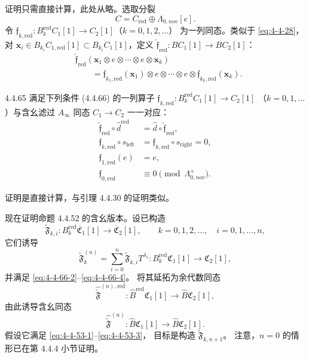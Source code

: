 证明只需直接计算，此处从略。选取分裂
\begin{equation}
 C=C_{\mathrm{red}}\oplus\Lambda_{0,nov}[e].
\tag{4.4.64}\label{eq:4-4-64}
\end{equation}
令
$\mathfrak f_{k,\mathrm{red}}\colon
B_k^{\mathrm{red}}C_1[1]\to C_2[1]$（$k=0,1,2,\ldots$）
为一列同态。类似于 \eqref{eq:4-4-28}，对
$\mathbf x_i\in B_{k_i}C_{1,\mathrm{red}}[1]
\subset B_{k_i}C_1[1]$，定义
$\widehat{\mathfrak f}_{\mathrm{red}}\colon
BC_1[1]\to BC_2[1]$：
\[
 \begin{aligned}
 &\widehat{\mathfrak f}_{\mathrm{red}}
 (\mathbf x_1\otimes e\otimes\cdots\otimes e\otimes\mathbf x_k)\\
 &\qquad=
 \mathfrak f_{k_1,\mathrm{red}}(\mathbf x_1)
 \otimes e\otimes\cdots\otimes e\otimes
 \mathfrak f_{k_k,\mathrm{red}}(\mathbf x_k).
 \end{aligned}
\]
\begin{lemma}{4.4.65}\label{lem:4-4-65}
满足下列条件 (4.4.66) 的一列算子
$\mathfrak f_{k,\mathrm{red}}\colon
B_k^{\mathrm{red}}C_1[1]\to C_2[1]$
（$k=0,1,\ldots$）与含幺滤过 $A_\infty$ 同态
$C_1\to C_2$ 一一对应：
\begin{align}
 \widehat{\mathfrak f}_{\mathrm{red}}
 \circ\widehat d^{\mathrm{red}}
 &=\widehat d\circ\widehat{\mathfrak f}_{\mathrm{red}},
 \tag{4.4.66.1}\label{eq:4-4-66-1}\\
 \mathfrak f_{k,\mathrm{red}}\circ s_{\mathrm{left}}
 &=\mathfrak f_{k,\mathrm{red}}\circ s_{\mathrm{right}}=0,
 \tag{4.4.66.2}\label{eq:4-4-66-2}\\
 \mathfrak f_{1,\mathrm{red}}(e)&=e,
 \tag{4.4.66.3}\label{eq:4-4-66-3}\\
 \mathfrak f_{0,\mathrm{red}}&\equiv0
 \pmod{\Lambda_{0,nov}^{+}}.
 \tag{4.4.66.4}\label{eq:4-4-66-4}
\end{align}
\end{lemma}

证明是直接计算，与引理 4.4.30 的证明类似。

现在证明命题 4.4.52 的含幺版本。设已构造
\[
 \widetilde{\mathfrak F}_{k,i}\colon
 B_k^{\mathrm{red}}\overline{\mathfrak C}_1[1]
 \longrightarrow\overline{\mathfrak C}_2[1],
 \qquad k=0,1,2,\ldots,\quad i=0,1,\ldots,n,
\]
它们诱导
\[
 \widetilde{\mathfrak F}^{(n)}_k
 =\sum_{i=0}^{n}\widetilde{\mathfrak F}_{k,i}T^{\lambda_i}
 \colon B_k^{\mathrm{red}}\mathfrak C_1[1]
 \longrightarrow\mathfrak C_2[1],
\]
并满足 \eqref{eq:4-4-66-2}--\eqref{eq:4-4-66-4}。
将其延拓为余代数同态
\[
 \widehat{\widetilde{\mathfrak F}}^{(n),\mathrm{red}}
 \colon\widehat B^{\mathrm{red}}\mathfrak C_1[1]
 \longrightarrow\widehat B\mathfrak C_2[1],
\]
由此诱导含幺同态
\[
 \widehat{\widetilde{\mathfrak F}}^{(n)}
 \colon\widehat B\mathfrak C_1[1]
 \longrightarrow\widehat B\mathfrak C_2[1].
\]
假设它满足 \eqref{eq:4-4-53-1}--\eqref{eq:4-4-53-3}，
目标是构造 $\widetilde{\mathfrak F}_{k,n+1}$。
注意，$n=0$ 的情形已在第 4.4.4 小节证明。

